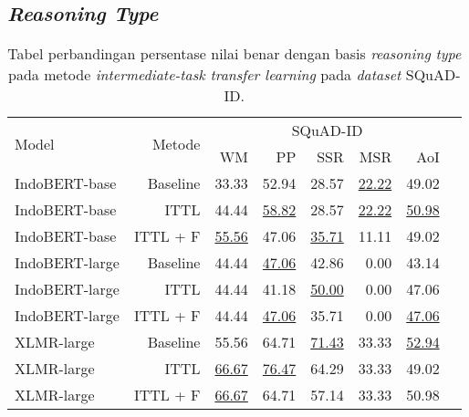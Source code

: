 \subsection*{\emph{Reasoning Type}}
\begin{table}[H]\centering
\begin{tabular}{lrrrrrrr}\toprule
\multirow{2}{*}{Model} &\multirow{2}{*}{Metode} &\multicolumn{5}{c}{SQuAD-ID} \\\cmidrule{3-7}
& &WM &PP &SSR &MSR &AoI \\\midrule
IndoBERT-base &Baseline &33.33 &52.94 &28.57 &\underline{22.22} &49.02 \\
IndoBERT-base &ITTL &44.44 &\underline{58.82} &28.57 &\underline{22.22} &\underline{50.98} \\
IndoBERT-base &ITTL + F &\underline{55.56} &47.06 &\underline{35.71} &11.11 &49.02 \\
\hline
IndoBERT-large &Baseline &44.44 &\underline{47.06} &42.86 &0.00 &43.14 \\
IndoBERT-large &ITTL &44.44 &41.18 &\underline{50.00} &0.00 &47.06 \\
IndoBERT-large &ITTL + F &44.44 &\underline{47.06} &35.71 &0.00 &\underline{47.06} \\
\hline
XLMR-large &Baseline &55.56 &64.71 &\underline{71.43} &33.33 &\underline{52.94} \\
XLMR-large &ITTL &\underline{66.67} &\underline{76.47} &64.29 &33.33 &49.02 \\
XLMR-large &ITTL + F &\underline{66.67} &64.71 &57.14 &33.33 &50.98 \\
\bottomrule
\end{tabular}
\caption{Tabel perbandingan persentase nilai benar dengan basis \emph{reasoning type} pada metode \emph{intermediate-task transfer learning} pada \emph{dataset} SQuAD-ID.}
\end{table}

